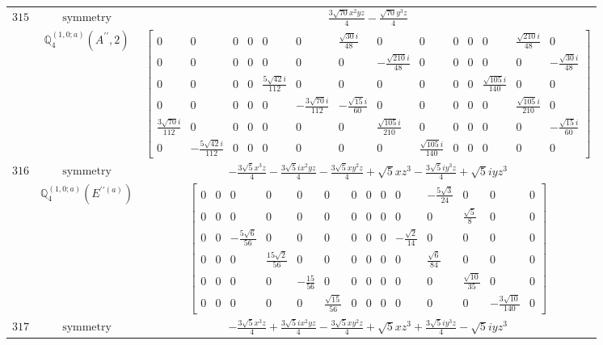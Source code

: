 \documentclass[fleqn,8pt,landscape]{jsarticle}
\begin{document}
\begin{longtable}{ccc}
$ 315 $ & $ \text{symmetry} $ & $ \frac{3 \sqrt{70} x^{2} y z}{4} - \frac{\sqrt{70} y^{3} z}{4} $ \\
$  $ & $ \mathbb{Q}_{4}^{(1,0;a)}(A^{\prime\prime},2) $ & $ \begin{bmatrix} 0 & 0 & 0 & 0 & 0 & 0 & \frac{\sqrt{30} i}{48} & 0 & 0 & 0 & 0 & 0 & \frac{\sqrt{210} i}{48} & 0 \\ 0 & 0 & 0 & 0 & 0 & 0 & 0 & - \frac{\sqrt{210} i}{48} & 0 & 0 & 0 & 0 & 0 & - \frac{\sqrt{30} i}{48} \\ 0 & 0 & 0 & 0 & \frac{5 \sqrt{42} i}{112} & 0 & 0 & 0 & 0 & 0 & 0 & \frac{\sqrt{105} i}{140} & 0 & 0 \\ 0 & 0 & 0 & 0 & 0 & - \frac{3 \sqrt{70} i}{112} & - \frac{\sqrt{15} i}{60} & 0 & 0 & 0 & 0 & 0 & \frac{\sqrt{105} i}{210} & 0 \\ \frac{3 \sqrt{70} i}{112} & 0 & 0 & 0 & 0 & 0 & 0 & \frac{\sqrt{105} i}{210} & 0 & 0 & 0 & 0 & 0 & - \frac{\sqrt{15} i}{60} \\ 0 & - \frac{5 \sqrt{42} i}{112} & 0 & 0 & 0 & 0 & 0 & 0 & \frac{\sqrt{105} i}{140} & 0 & 0 & 0 & 0 & 0 \end{bmatrix} $ \\ \hline
$ 316 $ & $ \text{symmetry} $ & $ - \frac{3 \sqrt{5} x^{3} z}{4} - \frac{3 \sqrt{5} i x^{2} y z}{4} - \frac{3 \sqrt{5} x y^{2} z}{4} + \sqrt{5} x z^{3} - \frac{3 \sqrt{5} i y^{3} z}{4} + \sqrt{5} i y z^{3} $ \\
$  $ & $ \mathbb{Q}_{4}^{(1,0;a)}(E^{\prime\prime(a)}) $ & $ \begin{bmatrix} 0 & 0 & 0 & 0 & 0 & 0 & 0 & 0 & 0 & 0 & - \frac{5 \sqrt{3}}{24} & 0 & 0 & 0 \\ 0 & 0 & 0 & 0 & 0 & 0 & 0 & 0 & 0 & 0 & 0 & \frac{\sqrt{5}}{8} & 0 & 0 \\ 0 & 0 & - \frac{5 \sqrt{6}}{56} & 0 & 0 & 0 & 0 & 0 & 0 & - \frac{\sqrt{2}}{14} & 0 & 0 & 0 & 0 \\ 0 & 0 & 0 & \frac{15 \sqrt{2}}{56} & 0 & 0 & 0 & 0 & 0 & 0 & \frac{\sqrt{6}}{84} & 0 & 0 & 0 \\ 0 & 0 & 0 & 0 & - \frac{15}{56} & 0 & 0 & 0 & 0 & 0 & 0 & \frac{\sqrt{10}}{35} & 0 & 0 \\ 0 & 0 & 0 & 0 & 0 & \frac{\sqrt{15}}{56} & 0 & 0 & 0 & 0 & 0 & 0 & - \frac{3 \sqrt{10}}{140} & 0 \end{bmatrix} $ \\ \hline
$ 317 $ & $ \text{symmetry} $ & $ - \frac{3 \sqrt{5} x^{3} z}{4} + \frac{3 \sqrt{5} i x^{2} y z}{4} - \frac{3 \sqrt{5} x y^{2} z}{4} + \sqrt{5} x z^{3} + \frac{3 \sqrt{5} i y^{3} z}{4} - \sqrt{5} i y z^{3} $ \\

\end{longtable}
\end{document}
